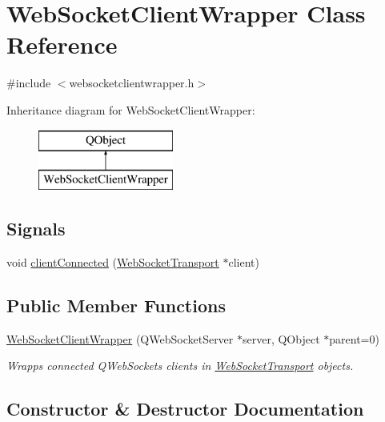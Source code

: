 \hypertarget{class_web_socket_client_wrapper}{}\section{Web\+Socket\+Client\+Wrapper Class Reference}
\label{class_web_socket_client_wrapper}


{\ttfamily \#include $<$websocketclientwrapper.\+h$>$}

Inheritance diagram for Web\+Socket\+Client\+Wrapper\+:\begin{figure}[H]
\begin{center}
\leavevmode
\includegraphics[height=2.000000cm]{class_web_socket_client_wrapper}
\end{center}
\end{figure}
\subsection*{Signals}
\begin{DoxyCompactItemize}
\item 
void \hyperlink{class_web_socket_client_wrapper_a67624fd48603482dd0631f699d19e87e}{client\+Connected} (\hyperlink{class_web_socket_transport}{Web\+Socket\+Transport} $\ast$client)
\end{DoxyCompactItemize}
\subsection*{Public Member Functions}
\begin{DoxyCompactItemize}
\item 
\hyperlink{class_web_socket_client_wrapper_a5af93779273d4a8e7cfcaf547ae04a52}{Web\+Socket\+Client\+Wrapper} (Q\+Web\+Socket\+Server $\ast$server, Q\+Object $\ast$parent=0)
\begin{DoxyCompactList}\small\item\em Wrapps connected Q\+Web\+Sockets clients in \hyperlink{class_web_socket_transport}{Web\+Socket\+Transport} objects. \end{DoxyCompactList}\end{DoxyCompactItemize}


\subsection{Constructor \& Destructor Documentation}
\hypertarget{class_web_socket_client_wrapper_a5af93779273d4a8e7cfcaf547ae04a52}{}
